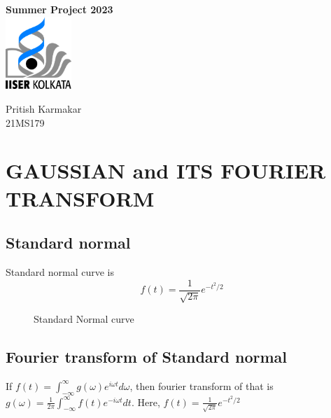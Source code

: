 \documentclass[11pt,a4paper]{article}
\author{Pritish Karmakar}
\begin{document}
	\begin{titlepage}
		\vspace*{3.5cm}
		\centering
		{\Huge\bfseries Summer Project 2023}\\
		\vspace{5cm}
		\includegraphics[width=2.5cm]{iiserk.png}
		
		\vspace{5cm}
		
		{\LARGE Pritish Karmakar\\}
		\vspace{0.3cm}
		{21MS179}
		\vfill
		
		
		\clearpage
		\tableofcontents
		\clearpage
		\listoffigures
	\end{titlepage}
	
\section{GAUSSIAN and ITS FOURIER TRANSFORM}

%


\subsection{Standard normal}
Standard normal curve is $$f(t)=\frac{1}{\sqrt{2\pi}}e^{-t^2 /2}$$

\begin{figure}[ht]
	\centering
	\scalebox{1}{}
	\caption{Standard Normal curve}
	\label{fig:gaussian}
\end{figure}


\subsection{Fourier transform of Standard normal}
If $f(t)=\int_{-\infty}^{\infty}g(\omega)e^{i\omega t} d\omega$, then fourier transform of that is $g(\omega)=\frac{1}{2\pi}\int_{-\infty}^{\infty}f(t)e^{-i\omega t} dt$. Here, $f(t)=\frac{1}{\sqrt{2\pi}}e^{-t^2 /2}$\\
\end{document}
